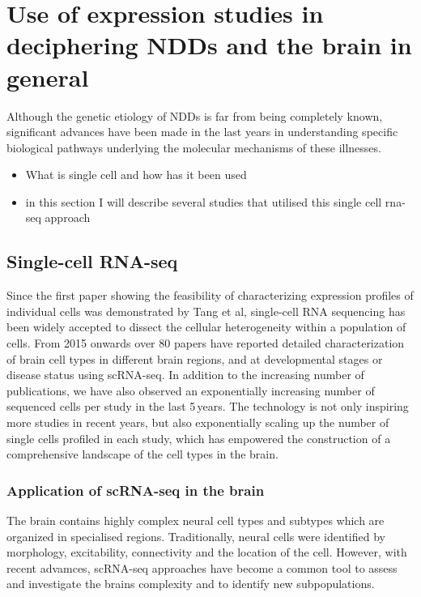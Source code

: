 \documentclass[12pt]{article}
\begin{document}
    \section{Use of expression studies in deciphering NDDs and the brain in general}
    Although the genetic etiology of NDDs is far from being completely known, significant advances have been made in the last years in understanding specific biological pathways underlying the molecular mechanisms of these illnesses. 
    \begin{itemize}
        \item What is single cell and how has it been used 
        \item in this section I will describe several studies that utilised this single cell rna-seq approach 
    \end{itemize}


\subsection{Single-cell RNA-seq}
Since the first paper showing the feasibility of characterizing expression profiles of individual cells was demonstrated by Tang et al, single-cell RNA sequencing has been widely accepted to dissect the cellular heterogeneity within a population of cells. 
From 2015 onwards over 80 papers have reported detailed characterization of brain cell types in different brain regions, and at developmental stages or disease status using scRNA-seq. In addition to the increasing number of publications, we have also observed an exponentially increasing number of sequenced cells per study in the last 5 years. The technology is not only inspiring more studies in recent years, but also exponentially scaling up the number of single cells profiled in each study, which has empowered the construction of a comprehensive landscape of the cell types in the brain.

\subsubsection{Application of scRNA-seq in the brain}
The  brain contains highly complex neural cell types and subtypes which are organized in specialised regions. Traditionally, neural cells were identified by morphology, excitability, connectivity and the location of the cell. However, with recent advamces, scRNA-seq approaches have become a common tool to assess and investigate the brains complexity and to identify new subpopulations. 
\end{document}
